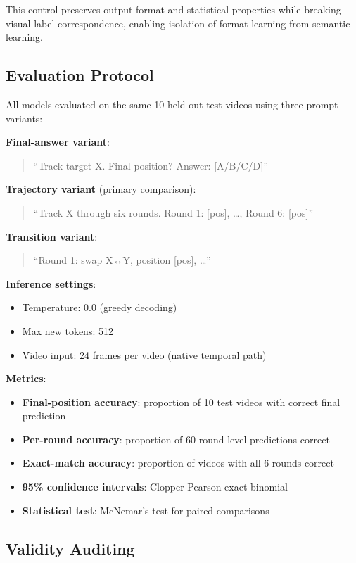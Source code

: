 This control preserves output format and statistical properties while breaking visual-label correspondence, enabling isolation of format learning from semantic learning.

\subsection{Evaluation Protocol}

All models evaluated on the same 10 held-out test videos using three prompt variants:

\textbf{Final-answer variant}:
\begin{quote}
``Track target X. Final position? Answer: [A/B/C/D]''
\end{quote}

\textbf{Trajectory variant} (primary comparison):
\begin{quote}
``Track X through six rounds. Round 1: [pos], \ldots, Round 6: [pos]''
\end{quote}

\textbf{Transition variant}:
\begin{quote}
``Round 1: swap X↔Y, position [pos], \ldots''
\end{quote}

\textbf{Inference settings}:
\begin{itemize}
    \item Temperature: 0.0 (greedy decoding)
    \item Max new tokens: 512
    \item Video input: 24 frames per video (native temporal path)
\end{itemize}

\textbf{Metrics}:
\begin{itemize}
    \item \textbf{Final-position accuracy}: proportion of 10 test videos with correct final prediction
    \item \textbf{Per-round accuracy}: proportion of 60 round-level predictions correct
    \item \textbf{Exact-match accuracy}: proportion of videos with all 6 rounds correct
    \item \textbf{95\% confidence intervals}: Clopper-Pearson exact binomial
    \item \textbf{Statistical test}: McNemar's test for paired comparisons
\end{itemize}

\subsection{Validity Auditing}

